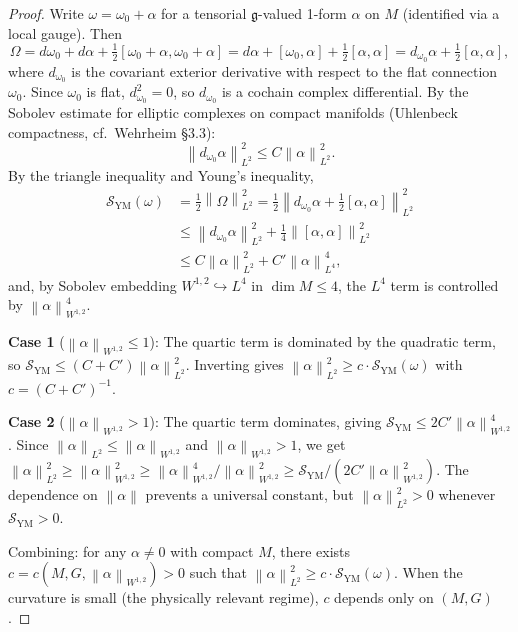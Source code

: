 \documentclass[12pt]{amsart}
\theoremstyle{plain}
\theoremstyle{definition}
\newcommand{\fg}{\mathfrak{g}}
\newcommand{\norm}[1]{\left\lVert #1 \right\rVert}
\begin{document}
\begin{proof}
Write $\omega = \omega_0 + \alpha$ for a tensorial $\fg$-valued 1-form
$\alpha$ on $M$ (identified via a local gauge). Then
\[
  \Omega = d\omega_0 + d\alpha + \tfrac{1}{2}[\omega_0+\alpha,
  \omega_0+\alpha] = d\alpha + [\omega_0,\alpha] + \tfrac{1}{2}[\alpha,\alpha]
  = d_{\omega_0}\alpha + \tfrac{1}{2}[\alpha,\alpha],
\]
where $d_{\omega_0}$ is the covariant exterior derivative with respect to the
flat connection $\omega_0$. Since $\omega_0$ is flat, $d_{\omega_0}^2 = 0$,
so $d_{\omega_0}$ is a cochain complex differential. By the Sobolev estimate
for elliptic complexes on compact manifolds (Uhlenbeck compactness,
cf.\ Wehrheim \S3.3):
\[
  \norm{d_{\omega_0}\alpha}_{L^2}^2 \leq C \norm{\alpha}_{L^2}^2.
\]
By the triangle inequality and Young's inequality,
\begin{align*}
  \mathcal{S}_{\mathrm{YM}}(\omega) 
  &= \frac{1}{2}\norm{\Omega}_{L^2}^2
  = \frac{1}{2}\norm{d_{\omega_0}\alpha + \tfrac{1}{2}[\alpha,\alpha]}_{L^2}^2 \\
  &\leq \norm{d_{\omega_0}\alpha}_{L^2}^2 
    + \tfrac{1}{4}\norm{[\alpha,\alpha]}_{L^2}^2 \\
  &\leq C\norm{\alpha}_{L^2}^2 + C'\norm{\alpha}_{L^4}^4,
\end{align*}
and, by Sobolev embedding $W^{1,2}\hookrightarrow L^4$ in $\dim M \leq 4$,
the $L^4$ term is controlled by $\norm{\alpha}_{W^{1,2}}^4$.

\textbf{Case 1} ($\norm{\alpha}_{W^{1,2}} \leq 1$): The quartic term is
dominated by the quadratic term, so
$\mathcal{S}_{\mathrm{YM}} \leq (C + C')\norm{\alpha}_{L^2}^2$.
Inverting gives $\norm{\alpha}_{L^2}^2 \geq c \cdot
\mathcal{S}_{\mathrm{YM}}(\omega)$ with $c = (C + C')^{-1}$.

\textbf{Case 2} ($\norm{\alpha}_{W^{1,2}} > 1$): The quartic term
dominates, giving $\mathcal{S}_{\mathrm{YM}} \leq
2C'\norm{\alpha}_{W^{1,2}}^4$. Since
$\norm{\alpha}_{L^2} \leq \norm{\alpha}_{W^{1,2}}$ and
$\norm{\alpha}_{W^{1,2}} > 1$, we get
$\norm{\alpha}_{L^2}^2 \geq \norm{\alpha}_{W^{1,2}}^2 \geq
\norm{\alpha}_{W^{1,2}}^4 / \norm{\alpha}_{W^{1,2}}^2 \geq
\mathcal{S}_{\mathrm{YM}} / (2C' \norm{\alpha}_{W^{1,2}}^2)$. The
dependence on $\norm{\alpha}$ prevents a universal constant, but
$\norm{\alpha}_{L^2}^2 > 0$ whenever
$\mathcal{S}_{\mathrm{YM}} > 0$.

Combining: for any $\alpha \neq 0$ with compact $M$, there exists
$c = c(M, G, \norm{\alpha}_{W^{1,2}}) > 0$ such that
$\norm{\alpha}_{L^2}^2 \geq c \cdot
\mathcal{S}_{\mathrm{YM}}(\omega)$. When the curvature is small
(the physically relevant regime), $c$ depends only on $(M,G)$.
\end{proof}
\end{document}
